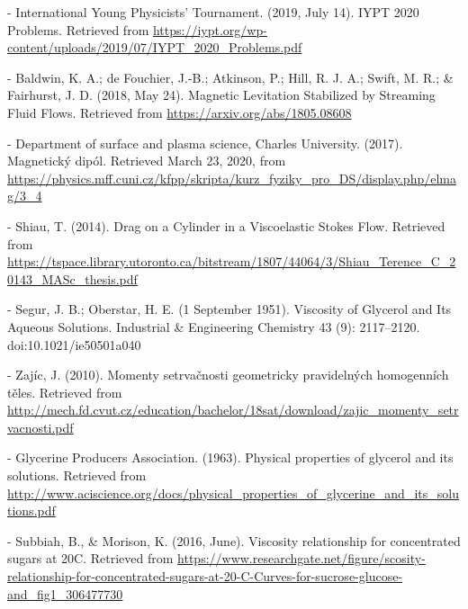 \documentclass[10pt,a4paper]{article}
\begin{document}
\begin{thebibliography}{[2]}

 - International Young Physicists’ Tournament. (2019, July 14). IYPT 2020 Problems. Retrieved from \url{https://iypt.org/wp-content/uploads/2019/07/IYPT_2020_Problems.pdf} 

 - Baldwin, K. A.; de Fouchier, J.-B.; Atkinson, P.; Hill, R. J. A.; Swift, M. R.; \& Fairhurst, J. D. (2018, May 24). Magnetic Levitation Stabilized by Streaming Fluid Flows. Retrieved from \url{https://arxiv.org/abs/1805.08608}

 - Department of surface and plasma science, Charles University. (2017). Magnetický dipól. Retrieved March 23, 2020, from \url{https://physics.mff.cuni.cz/kfpp/skripta/kurz_fyziky_pro_DS/display.php/elmag/3_4}

 - Shiau, T. (2014). Drag on a Cylinder in a Viscoelastic Stokes Flow. Retrieved from \url{https://tspace.library.utoronto.ca/bitstream/1807/44064/3/Shiau_Terence_C_20143_MASc_thesis.pdf}

 - Segur, J. B.; Oberstar, H. E. (1 September 1951). Viscosity of Glycerol and Its Aqueous Solutions. Industrial \& Engineering Chemistry 43 (9): 2117–2120. doi:10.1021/ie50501a040

 - Zajíc, J. (2010). Momenty setrvačnosti geometricky pravidelných homogenních těles. Retrieved from \url{http://mech.fd.cvut.cz/education/bachelor/18sat/download/zajic_momenty_setrvacnosti.pdf}

 - Glycerine Producers Association. (1963). Physical properties of glycerol and its solutions. Retrieved from \url{http://www.aciscience.org/docs/physical_properties_of_glycerine_and_its_solutions.pdf} 

 - Subbiah, B., \& Morison, K. (2016, June). Viscosity relationship for concentrated sugars at 20\degree C. Retrieved from \url{https://www.researchgate.net/figure/scosity-relationship-for-concentrated-sugars-at-20-C-Curves-for-sucrose-glucose-and_fig1_306477730}

\end{thebibliography}
\end{document}
